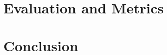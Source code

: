 \documentclass{article}
\begin{document}
    \section{Evaluation and Metrics}


    \section{Conclusion}
\end{document}

